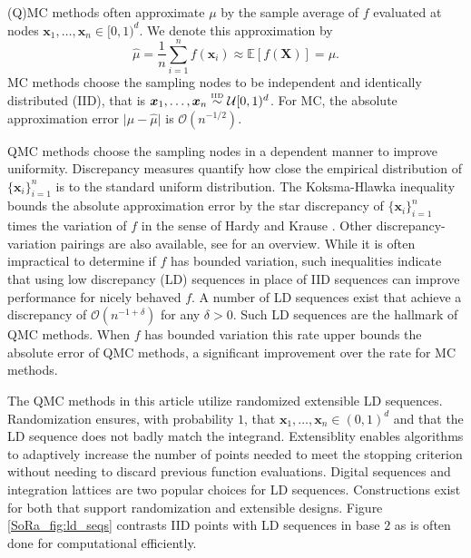 \documentclass[graybox]{svmult}
\begin{document}
(Q)MC methods often approximate $\mu$ by the sample average of $f$ evaluated at nodes $\boldsymbol{x}_1,\dots,\boldsymbol{x}_n \in [0,1)^d$. We denote this approximation by  
\begin{equation}
    \label{SoRa_eq:mcapprox}
    \hat{\mu} = \frac{1}{n}\sum_{i=1}^n f(\boldsymbol{x}_i) \approx \mathbb{E}[f(\boldsymbol{X})] = \mu. 
\end{equation}
MC methods choose the sampling nodes to be independent and identically distributed (IID), that is $\boldsymbol{x}_1,\dots,\boldsymbol{x}_n \overset{\text{\tiny IID}}{\sim} \mathcal{U}[0,1)^{d}$. For MC, the absolute approximation error $\lvert \mu - \hat{\mu} \rvert$ is $\mathcal{O}(n^{-1/2})$. 

QMC methods choose the sampling nodes in a dependent manner to improve uniformity. Discrepancy measures quantify how close the empirical distribution of $\{\boldsymbol{x}_i\}_{i=1}^n$ is to the standard uniform distribution. The Koksma-Hlawka inequality bounds the absolute approximation error by the star discrepancy of $\{\boldsymbol{x}_i\}_{i=1}^n$ times the variation of $f$ in the sense of Hardy and Krause \cite{dick2013high}. Other discrepancy-variation pairings are also available, see \cite{hickernell1998generalized} for an overview. While it is often impractical to determine if $f$ has bounded variation, such inequalities indicate that using low discrepancy (LD) sequences in place of IID sequences can improve performance for nicely behaved $f$. A number of LD sequences exist that achieve a discrepancy of $\mathcal{O}(n^{-1+\delta})$ for any $\delta > 0$. Such LD sequences are the hallmark of QMC methods. When $f$ has bounded variation this rate upper bounds the absolute error of QMC methods, a significant improvement over the rate for MC methods. %

The QMC methods in this article utilize randomized extensible LD sequences. Randomization ensures, with probability $1$, that $\boldsymbol{x}_1,\dots,\boldsymbol{x}_n \in (0,1)^d$ and that the LD sequence does not badly match the integrand. Extensiblity enables algorithms to adaptively increase the number of points needed to meet the stopping criterion without needing to discard previous function evaluations. Digital sequences and integration lattices are two popular choices for LD sequences. Constructions exist for both that support randomization and extensible designs. Figure \ref{SoRa_fig:ld_seqs} contrasts IID points with LD sequences in base $2$ as is often done for computational efficiently.
\end{document}
